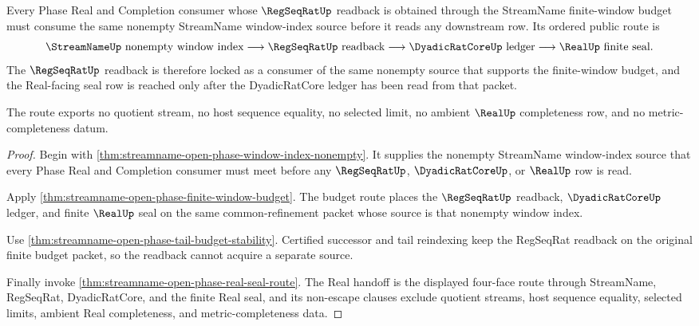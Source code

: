 \begin{theorem}
\label{thm:streamname-open-phase-regseqrat-budget-source-lock}
Every Phase Real and Completion consumer whose $\RegSeqRatUp$ readback is obtained through the StreamName finite-window budget must consume the same nonempty StreamName window-index source before it reads any downstream row. Its ordered public route is
$$
\StreamNameUp\text{ nonempty window index}\longrightarrow \RegSeqRatUp\text{ readback}\longrightarrow \DyadicRatCoreUp\text{ ledger}\longrightarrow \RealUp\text{ finite seal}.
$$
The $\RegSeqRatUp$ readback is therefore locked as a consumer of the same nonempty source that supports the finite-window budget, and the Real-facing seal row is reached only after the DyadicRatCore ledger has been read from that packet.

The route exports no quotient stream, no host sequence equality, no selected limit, no ambient $\RealUp$ completeness row, and no metric-completeness datum.
\end{theorem}
\begin{proof}
Begin with \autoref{thm:streamname-open-phase-window-index-nonempty}. It supplies the nonempty StreamName window-index source that every Phase Real and Completion consumer must meet before any $\RegSeqRatUp$, $\DyadicRatCoreUp$, or $\RealUp$ row is read.

Apply \autoref{thm:streamname-open-phase-finite-window-budget}. The budget route places the $\RegSeqRatUp$ readback, $\DyadicRatCoreUp$ ledger, and finite $\RealUp$ seal on the same common-refinement packet whose source is that nonempty window index.

Use \autoref{thm:streamname-open-phase-tail-budget-stability}. Certified successor and tail reindexing keep the RegSeqRat readback on the original finite budget packet, so the readback cannot acquire a separate source.

Finally invoke \autoref{thm:streamname-open-phase-real-seal-route}. The Real handoff is the displayed four-face route through StreamName, RegSeqRat, DyadicRatCore, and the finite Real seal, and its non-escape clauses exclude quotient streams, host sequence equality, selected limits, ambient Real completeness, and metric-completeness data.
\end{proof}

